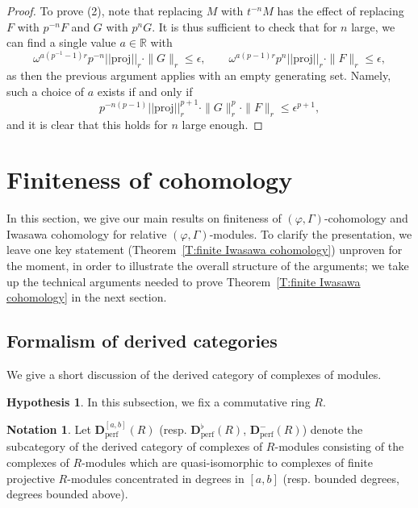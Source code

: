 \documentclass[12pt]{article}
\theoremstyle{definition}
\newtheorem{hypothesis}[theorem]{Hypothesis}
\newtheorem{notation}[theorem]{Notation}
\numberwithin{equation}{theorem}
\newcommand{\RR}{\mathbb{R}}
\newcommand{\bbD}{\mathbf{D}}
\newcommand{\perf}{\mathrm{perf}}
\begin{document}
\begin{proof}
To prove (2), note that replacing $M$ with $t^{-n}M$ has the effect of replacing $F$ with $p^{-n} F$ and 
$G$ with $p^n G$. It is thus sufficient to check that for $n$ large, we can find a single value
$a \in \RR$ with 
\[
\omega^{a(p^{-1}-1)r} p^{-n}||\mathrm{proj}||_r \cdot \|G\|_r \leq \epsilon, \qquad \omega^{a(p-1)r} p^n ||\mathrm{proj}||_r \cdot \|F\|_r \leq \epsilon,
\]
as then the previous argument applies with an empty generating set. Namely, such a choice of $a$ exists if and only if
\[
p^{-n(p-1)} ||\mathrm{proj}||_r^{p+1}\cdot\|G\|_r^p \cdot \|F\|_r \leq \epsilon^{p+1},
\]
and it is clear that this holds for $n$ large enough.
\end{proof}





\section{Finiteness of cohomology}
\label{S:finiteness of cohomology}

In this section, we give our main results on finiteness of $(\varphi,
\Gamma)$-cohomology and Iwasawa cohomology for relative $(\varphi,
\Gamma)$-modules.  To clarify the presentation, we leave one key
statement (Theorem~\ref{T:finite Iwasawa cohomology}) unproven for the
moment, in order to illustrate the overall structure of the arguments;
we take up the technical arguments needed to prove
Theorem~\ref{T:finite Iwasawa cohomology} in the next section.

\subsection{Formalism of derived categories}

We give a short discussion of the derived category of complexes of modules.

\begin{hypothesis}
In this subsection, we fix a commutative ring $R$.
\end{hypothesis}

\begin{notation}
Let $\bbD_{\perf}^{[a,b]}(R)$ (resp. $\bbD_\perf^\flat(R)$, $\bbD_\perf^-(R)$) denote the subcategory of the derived category of complexes of $R$-modules consisting of the complexes of $R$-modules which are quasi-isomorphic to complexes of finite projective $R$-modules concentrated in degrees in $[a,b]$ (resp. bounded degrees, degrees bounded above).
\end{notation}
\end{document}
